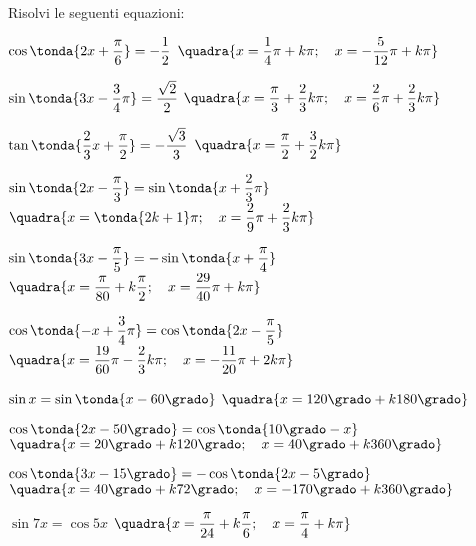 \begin{esercizio}\label{ese:03.1}
Risolvi le seguenti equazioni:
 \begin{enumeratea}
  \item $\cos \tonda{2x + \dfrac{\pi}{6}} = -\dfrac{1}{2}$
   \hfill $\quadra{x = \dfrac{1}{4}\pi + k \pi; \quad
                   x = -\dfrac{5}{12}\pi + k \pi}$
  \item $\sin \tonda{3 x - \dfrac{3}{4} \pi}= \dfrac{\sqrt{2}}{2}$
   \hfill $\quadra{x = \dfrac{\pi}{3} + \dfrac{2}{3} k \pi; \quad
                   x = \dfrac{2}{6}\pi + \dfrac{2}{3} k \pi}$
  \item $\tan \tonda{\dfrac{2}{3} x + \dfrac{\pi}{2}} = -\dfrac{\sqrt{3}}{3}$
   \hfill $\quadra{x = \dfrac{\pi}{2} + \dfrac{3}{2} k \pi}$
  \item $\sin \tonda{2 x - \dfrac{\pi}{3}} = \sin \tonda{x + \dfrac{2}{3}\pi}$
   \hfill $\quadra{x = \tonda{2k +1} \pi; \quad
                   x = \dfrac{2}{9}\pi + \dfrac{2}{3} k \pi}$
  \item $\sin \tonda{3 x - \dfrac{\pi}{5}} = - \sin \tonda{x + \dfrac{\pi}{4}}$
   \hfill $\quadra{x = \dfrac{\pi}{80} + k \dfrac{\pi}{2}; \quad
                   x = \dfrac{29}{40}\pi + k \pi}$
  \item $\cos \tonda{-x + \dfrac{3}{4}\pi} = \cos \tonda{2 x - \dfrac{\pi}{5}}$
   \hfill $\quadra{x = \dfrac{19}{60}\pi - \dfrac{2}{3} k \pi; \quad
                   x = - \dfrac{11}{20}\pi + 2 k \pi}$
  \item $\sin x = \sin \tonda{x - 60 \grado}$
   \hfill $\quadra{x = 120 \grado + k 180 \grado}$
  \item $\cos \tonda{2x - 50 \grado} = \cos \tonda{10 \grado - x}$
   \hfill $\quadra{x = 20 \grado + k 120 \grado; \quad
                   x = 40 \grado + k 360 \grado}$
  \item $\cos \tonda{3x - 15 \grado} = - \cos \tonda{2 x - 5 \grado}$
   \hfill $\quadra{x = 40 \grado + k 72 \grado; \quad
                   x = -170 \grado + k 360 \grado}$
  \item $\sin 7 x = \cos 5 x$
   \hfill $\quadra{x = \dfrac{\pi}{24} + k \dfrac{\pi}{6}; \quad
                   x = \dfrac{\pi}{4} + k \pi}$
 \end{enumeratea}
\end{esercizio}

